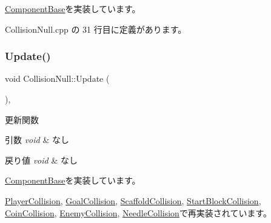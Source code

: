 \mbox{\hyperlink{class_component_base_a9f42beaf0383d6f629819579cab4de57}{Component\+Base}}を実装しています。



 Collision\+Null.\+cpp の 31 行目に定義があります。

\mbox{\label{class_collision_null_ad6ac0e9b06fcb4e3d19a5c3c1cadfe7e}} 
\subsubsection{\texorpdfstring{Update()}{Update()}}
{\footnotesize\ttfamily void Collision\+Null\+::\+Update (\begin{DoxyParamCaption}{ }\end{DoxyParamCaption})\hspace{0.3cm}{\ttfamily [override]}, {\ttfamily [virtual]}}



更新関数 


\begin{DoxyParams}{引数}
{\em void} & なし \\
\hline
\end{DoxyParams}

\begin{DoxyRetVals}{戻り値}
{\em void} & なし \\
\hline
\end{DoxyRetVals}


\mbox{\hyperlink{class_component_base_a58e66d65bc8f3cd5ab67b4b2deab4fc2}{Component\+Base}}を実装しています。



\mbox{\hyperlink{class_player_collision_a09f97f220903f5724a3af6b97af3a336}{Player\+Collision}}, \mbox{\hyperlink{class_goal_collision_a1e3995dc2f5ba2678580d06699ca6936}{Goal\+Collision}}, \mbox{\hyperlink{class_scaffold_collision_ad57ee33c985c818f7f4a5af87a060e16}{Scaffold\+Collision}}, \mbox{\hyperlink{class_start_block_collision_a0e70da365db1a2bb07c56609d28217ad}{Start\+Block\+Collision}}, \mbox{\hyperlink{class_coin_collision_a981fd9b1b8c688a757a456a56d80501b}{Coin\+Collision}}, \mbox{\hyperlink{class_enemy_collision_ab54133504d867c6d2070d2f3854a0aaf}{Enemy\+Collision}}, \mbox{\hyperlink{class_needle_collision_a9226bcc45aa952abcafa56c7af8c8627}{Needle\+Collision}}で再実装されています。



